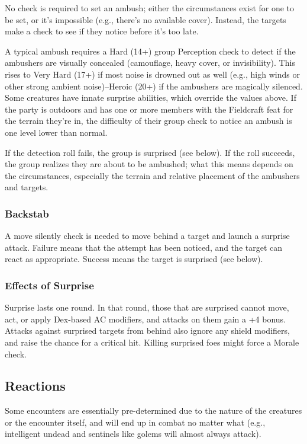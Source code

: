 \documentclass{article}
\begin{document}
\begin{multicols}{2}
No check is required to set an ambush; either the circumstances exist
for one to be set, or it's impossible (e.g., there's no available
cover). Instead, the targets make a check to see if they notice before
it's too late.

A typical ambush requires a Hard (14+) group Perception check to detect
if the ambushers are visually concealed (camouflage, heavy cover, or
invisibility). This rises to Very Hard (17+) if most noise is drowned
out as well (e.g., high winds or other strong ambient noise)--Heroic
(20+) if the ambushers are magically silenced. Some creatures have
innate surprise abilities, which override the values above. If the party
is outdoors and has one or more members with the Fieldcraft feat for the
terrain they're in, the difficulty of their group check to notice an
ambush is one level lower than normal.

If the detection roll fails, the group is surprised (see below). If the
roll succeeds, the group realizes they are about to be ambushed; what
this means depends on the circumstances, especially the terrain and
relative placement of the ambushers and targets.

\subsubsection{Backstab}\label{backstab}

A move silently check is needed to move behind a target and launch a
surprise attack. Failure means that the attempt has been noticed, and
the target can react as appropriate. Success means the target is
surprised (see below).

\subsubsection{Effects of Surprise}\label{effects-of-surprise}

Surprise lasts one round. In that round, those that are surprised cannot
move, act, or apply Dex-based AC modifiers, and attacks on them gain a
+4 bonus. Attacks against surprised targets from behind also ignore any
shield modifiers, and raise the chance for a critical hit. Killing
surprised foes might force a Morale check.

\subsection{Reactions}\label{reactions}

Some encounters are essentially pre-determined due to the nature of the
creatures or the encounter itself, and will end up in combat no matter
what (e.g., intelligent undead and sentinels like golems will almost
always attack).


\end{multicols}
\end{document}
